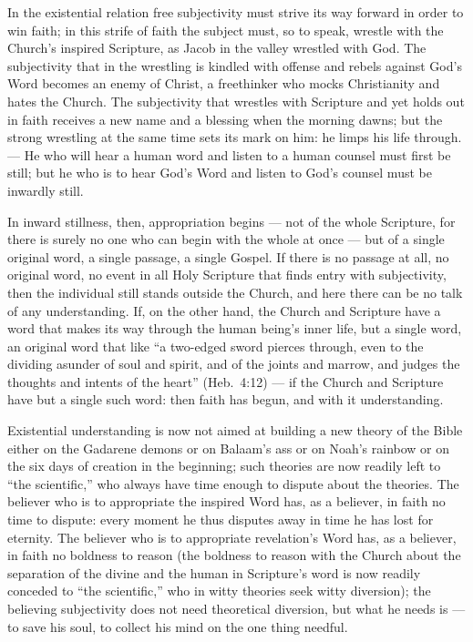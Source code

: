 \documentclass[12pt,a4paper]{book}
\begin{document}
In the existential relation free subjectivity must strive its way forward in order to win faith; in this
strife of faith the subject must, so to speak, wrestle with the Church's inspired Scripture, as Jacob in
the valley wrestled with God. The subjectivity that in the wrestling is kindled with offense and rebels
against God's Word becomes an enemy of Christ, a freethinker who mocks Christianity and hates the
Church. The subjectivity that wrestles with Scripture and yet holds out in faith receives a new name and
a blessing when the morning dawns; but the strong wrestling at the same time sets its mark on him: he
limps his life through. --- He who will hear a human word and listen to a human counsel must first be
still; but he who is to hear God's Word and listen to God's counsel must be inwardly still.

In inward stillness, then, appropriation begins --- not of the whole Scripture, for there is surely no
one who can begin with the whole at once --- but of a single original word, a single passage, a single
Gospel. If there is no passage at all, no original word, no event in all Holy Scripture that finds entry
with subjectivity, then the individual still stands outside the Church, and here there can be no talk of
any understanding. If, on the other hand, the Church and Scripture have a word that makes its way through
the human being's inner life, but a single word, an original word that like ``a two-edged sword pierces
through, even to the dividing asunder of soul
and spirit, and of the joints and marrow, and judges the thoughts and intents of the heart'' (Heb.\ 4:12)
--- if the Church and Scripture have but a single such word: then faith has begun, and with it
understanding.

Existential understanding is now not aimed at building a new theory of the Bible either on the Gadarene
demons or on Balaam's ass or on Noah's rainbow or on the six days of creation in the beginning; such
theories are now readily left to ``the scientific,'' who always have time enough to dispute about the
theories. The believer who is to appropriate the inspired Word has, as a believer, in faith no time to
dispute: every moment he thus disputes away in time he has lost for eternity. The believer who is to
appropriate revelation's Word has, as a believer, in faith no boldness to reason (the boldness to reason
with the Church about the separation of the divine and the human in Scripture's word is now readily
conceded to ``the scientific,'' who in witty theories seek witty diversion); the believing subjectivity
does not need theoretical diversion, but what he needs is --- to save his soul, to collect his mind on
the one thing needful.
\end{document}
